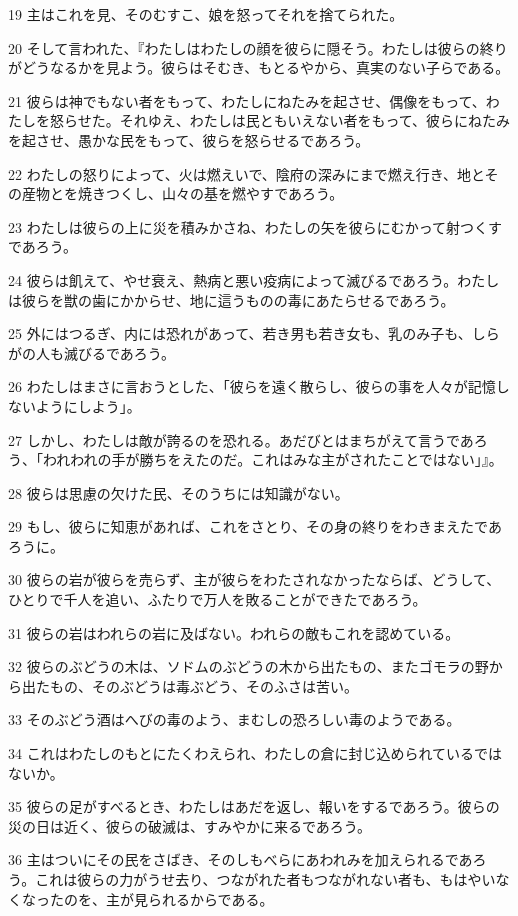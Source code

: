 \par 19 主はこれを見、そのむすこ、娘を怒ってそれを捨てられた。
\par 20 そして言われた、『わたしはわたしの顔を彼らに隠そう。わたしは彼らの終りがどうなるかを見よう。彼らはそむき、もとるやから、真実のない子らである。
\par 21 彼らは神でもない者をもって、わたしにねたみを起させ、偶像をもって、わたしを怒らせた。それゆえ、わたしは民ともいえない者をもって、彼らにねたみを起させ、愚かな民をもって、彼らを怒らせるであろう。
\par 22 わたしの怒りによって、火は燃えいで、陰府の深みにまで燃え行き、地とその産物とを焼きつくし、山々の基を燃やすであろう。
\par 23 わたしは彼らの上に災を積みかさね、わたしの矢を彼らにむかって射つくすであろう。
\par 24 彼らは飢えて、やせ衰え、熱病と悪い疫病によって滅びるであろう。わたしは彼らを獣の歯にかからせ、地に這うものの毒にあたらせるであろう。
\par 25 外にはつるぎ、内には恐れがあって、若き男も若き女も、乳のみ子も、しらがの人も滅びるであろう。
\par 26 わたしはまさに言おうとした、「彼らを遠く散らし、彼らの事を人々が記憶しないようにしよう」。
\par 27 しかし、わたしは敵が誇るのを恐れる。あだびとはまちがえて言うであろう、「われわれの手が勝ちをえたのだ。これはみな主がされたことではない」』。
\par 28 彼らは思慮の欠けた民、そのうちには知識がない。
\par 29 もし、彼らに知恵があれば、これをさとり、その身の終りをわきまえたであろうに。
\par 30 彼らの岩が彼らを売らず、主が彼らをわたされなかったならば、どうして、ひとりで千人を追い、ふたりで万人を敗ることができたであろう。
\par 31 彼らの岩はわれらの岩に及ばない。われらの敵もこれを認めている。
\par 32 彼らのぶどうの木は、ソドムのぶどうの木から出たもの、またゴモラの野から出たもの、そのぶどうは毒ぶどう、そのふさは苦い。
\par 33 そのぶどう酒はへびの毒のよう、まむしの恐ろしい毒のようである。
\par 34 これはわたしのもとにたくわえられ、わたしの倉に封じ込められているではないか。
\par 35 彼らの足がすべるとき、わたしはあだを返し、報いをするであろう。彼らの災の日は近く、彼らの破滅は、すみやかに来るであろう。
\par 36 主はついにその民をさばき、そのしもべらにあわれみを加えられるであろう。これは彼らの力がうせ去り、つながれた者もつながれない者も、もはやいなくなったのを、主が見られるからである。
